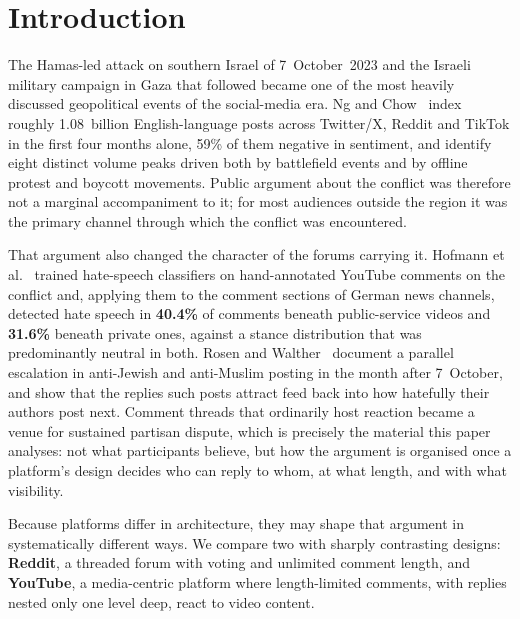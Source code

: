 \documentclass[10pt,twocolumn]{article}
\begin{document}
\section{Introduction}
The Hamas-led attack on southern Israel of 7~October~2023 and the Israeli military
campaign in Gaza that followed became one of the most heavily discussed
geopolitical events of the social-media era. Ng and Chow~\cite{ngchow2025} index
roughly 1.08~billion English-language posts across Twitter/X, Reddit and TikTok in
the first four months alone, 59\% of them negative in sentiment, and identify eight
distinct volume peaks driven both by battlefield events and by offline protest and
boycott movements. Public argument about the conflict was therefore not a marginal
accompaniment to it; for most audiences outside the region it was the primary
channel through which the conflict was encountered.

That argument also changed the character of the forums carrying it. Hofmann
et al.~\cite{hofmann2026} trained hate-speech classifiers on hand-annotated YouTube
comments on the conflict and, applying them to the comment sections of German news
channels, detected hate speech in \textbf{40.4\%} of comments beneath public-service
videos and \textbf{31.6\%} beneath private ones, against a stance distribution that
was predominantly neutral in both. Rosen and Walther~\cite{rosen2025} document a
parallel escalation in anti-Jewish and anti-Muslim posting in the month after
7~October, and show that the replies such posts attract feed back into how
hatefully their authors post next.
Comment threads that ordinarily host reaction became a venue for
sustained partisan dispute, which is precisely the material this paper analyses:
not what participants believe, but how the argument is organised once a platform's
design decides who can reply to whom, at what length, and with what visibility.

Because platforms differ in architecture, they may shape that argument in
systematically different ways. We compare two with sharply contrasting designs:
\textbf{Reddit}, a threaded forum with voting and unlimited comment length, and
\textbf{YouTube}, a media-centric platform where length-limited comments, with replies
nested only one level deep, react to video content.
\end{document}
